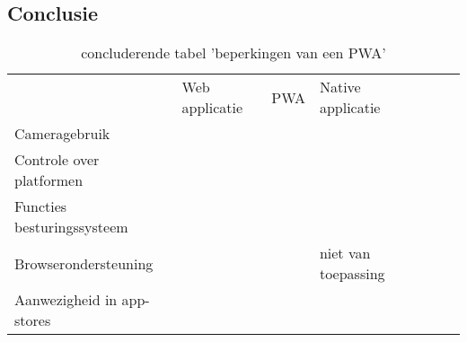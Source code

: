 	
\subsection{Conclusie}
	\begin{table}[H]
		\begin{tabular}{lp{35mm}lp{35mm}lp{35mm}l}
			                         			  & Web applicatie 	 				 & PWA								 & Native applicatie \\
			Cameragebruik                  & \cellcolor{red!50}      		 & \cellcolor{red!50}			& \cellcolor{green!40}\\
			Controle over platformen   	& \cellcolor{red!50}      	  & \cellcolor{red!50}		& \cellcolor{green!40}\\
			Functies besturingssysteem  & \cellcolor{red!50}      		 & \cellcolor{orange!50}		& \cellcolor{green!40}\\
			Browserondersteuning		 & \cellcolor{green!40}     		& \cellcolor{orange!50}		   &niet van toepassing\\
			Aanwezigheid in app-stores	 & \cellcolor{red!50}      		    & \cellcolor{red!50}			& \cellcolor{green!40}\\
		
		\end{tabular}
		\caption{concluderende tabel 'beperkingen van een PWA'}
	\end{table}